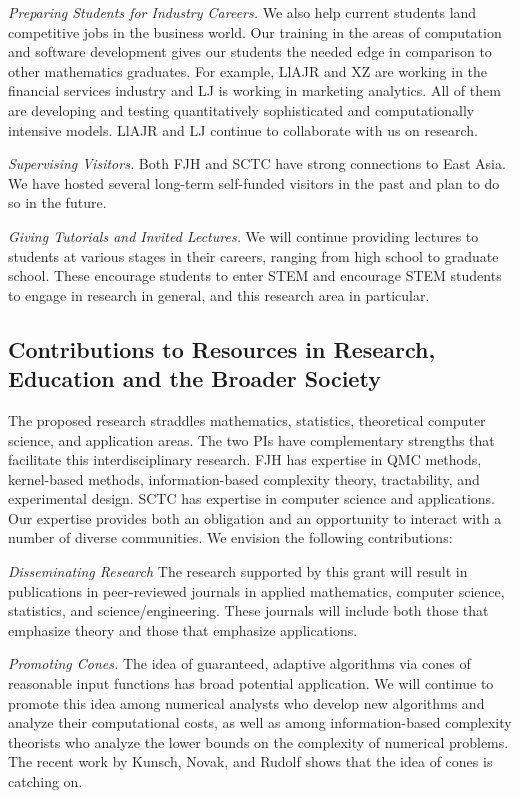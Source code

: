 \documentclass[11pt]{NSFamsart}
\newcommand{\QMC}{QMC\xspace}
\begin{document}
\emph{Preparing Students for Industry Careers.}
We also help current students land 
competitive jobs in the business world. Our training in the areas of computation and software 
development gives our students the needed edge in comparison to other mathematics 
graduates. For example, LlAJR and XZ are working in the financial services industry and  LJ is 
working in marketing analytics.  All of them are developing and testing quantitatively sophisticated 
and computationally intensive models.  LlAJR and LJ continue to collaborate with us on research.

\emph{Supervising Visitors.}
Both FJH and SCTC have strong connections to East Asia.  We have hosted several long-term 
self-funded visitors in the past and plan to do so in the future.

\emph{Giving Tutorials and Invited Lectures.}
We will continue providing lectures to students at various stages in their careers, ranging from high
school to graduate school. These encourage students to enter STEM and encourage STEM students 
to engage in research in general, and this research area in particular.


\subsection{Contributions to Resources in Research, Education and the Broader Society} 
\label{BroaderTwoSec}

The proposed research straddles mathematics, statistics, theoretical computer science, and 
application areas.  The two PIs have complementary strengths that facilitate this interdisciplinary research.  FJH 
has expertise in \QMC methods, kernel-based methods, information-based complexity 
theory, tractability, and experimental design. SCTC has expertise in computer science and applications.  Our 
expertise provides both an obligation and an opportunity to interact with a number of diverse 
communities. We envision the following contributions:

\emph{Disseminating Research}
The research supported by this grant will result in publications in peer-reviewed journals in applied
mathematics, computer science, statistics, and science/engineering. These 
journals will include both those that emphasize theory and those that emphasize applications.

\emph{Promoting Cones.} The idea of guaranteed, adaptive algorithms via cones of reasonable input 
functions has broad potential application.  We will continue to promote this idea among numerical analysts 
who 
develop new algorithms and analyze their computational costs, as well as among information-based 
complexity theorists who analyze the lower bounds on the complexity of numerical problems.  The recent work by Kunsch, Novak, and Rudolf \cite{KunEtal19a} shows that the idea of cones is catching on.
\end{document}

